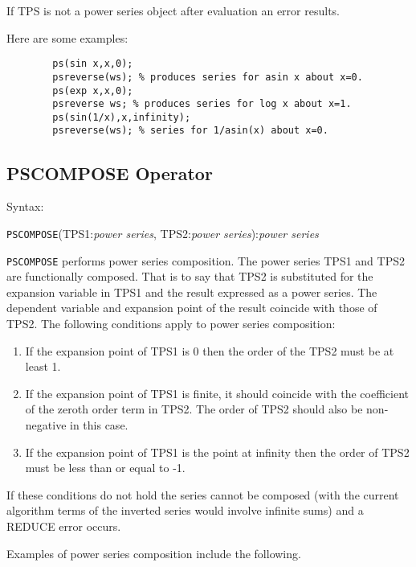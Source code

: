 If TPS is not a power series object after evaluation an error results.

\noindent Here are some examples:
\begin{verbatim}
        ps(sin x,x,0);
        psreverse(ws); % produces series for asin x about x=0.
        ps(exp x,x,0);
        psreverse ws; % produces series for log x about x=1.
        ps(sin(1/x),x,infinity);
        psreverse(ws); % series for 1/asin(x) about x=0.
\end{verbatim}

\subsection{PSCOMPOSE Operator}

Syntax:

\hspace*{2em} {\tt PSCOMPOSE}(TPS1:{\em power series},
TPS2:{\em power series}):{\em power series}

{\tt PSCOMPOSE} performs power series composition.
The power series TPS1 and TPS2 are functionally composed.
That is to say that TPS2 is substituted for the expansion
variable in TPS1 and the result expressed as a power series. The
dependent variable and expansion point of the result coincide with
those of TPS2.  The following conditions apply to power series
composition:

\begin{enumerate}
\item If the expansion point of TPS1 is 0 then the order of the
TPS2 must be at least 1.

\item If the expansion point of TPS1 is finite, it should
coincide with the coefficient of the zeroth order term in TPS2.
The order of TPS2 should also be non-negative in this case.

\item If the expansion point of TPS1 is the point at infinity
then the order of TPS2 must be less than or equal to -1.

\end{enumerate}

If these conditions do not hold the series cannot be composed (with
the current algorithm terms of the inverted series would involve
infinite sums) and a REDUCE error occurs.

\noindent Examples of power series composition include the following.

